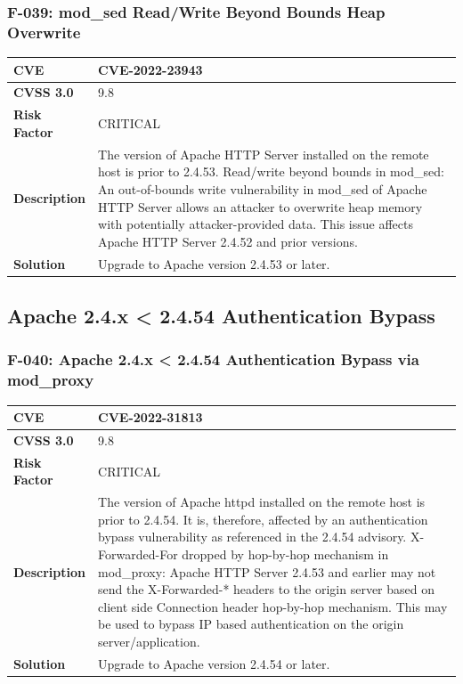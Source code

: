\subsubsection{F-039: mod\_sed Read/Write Beyond Bounds Heap Overwrite}
\begin{tabular}{|p{2.8cm}|p{12.2cm}|}
\hline
\textbf{CVE} & CVE-2022-23943 \\ \hline
\textbf{CVSS 3.0} & 9.8 \\ \hline
\textbf{Risk Factor} & CRITICAL \\ \hline
\textbf{Description} & The version of Apache HTTP Server installed on the remote host is prior to 2.4.53. Read/write beyond bounds in mod\_sed: An out-of-bounds write vulnerability in mod\_sed of Apache HTTP Server allows an attacker to overwrite heap memory with potentially attacker-provided data. This issue affects Apache HTTP Server 2.4.52 and prior versions. \\ \hline
\textbf{Solution} & Upgrade to Apache version 2.4.53 or later. \\ \hline
\end{tabular}

%
%
\subsection{Apache 2.4.x < 2.4.54 Authentication Bypass}

\subsubsection{F-040: Apache 2.4.x < 2.4.54 Authentication Bypass via mod\_proxy}
\begin{tabular}{|p{2.8cm}|p{12.2cm}|}
\hline
\textbf{CVE} & CVE-2022-31813 \\ \hline
\textbf{CVSS 3.0} & 9.8 \\ \hline
\textbf{Risk Factor} & CRITICAL \\ \hline
\textbf{Description} & The version of Apache httpd installed on the remote host is prior to 2.4.54. It is, therefore, affected by an authentication bypass vulnerability as referenced in the 2.4.54 advisory. X-Forwarded-For dropped by hop-by-hop mechanism in mod\_proxy: Apache HTTP Server 2.4.53 and earlier may not send the X-Forwarded-* headers to the origin server based on client side Connection header hop-by-hop mechanism. This may be used to bypass IP based authentication on the origin server/application. \\ \hline
\textbf{Solution} & Upgrade to Apache version 2.4.54 or later. \\ \hline
\end{tabular}

